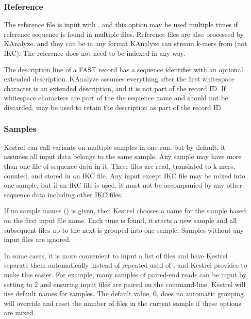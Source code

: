 \subsubsection{Reference}
\label{sec.process.input.seq}

The reference file is input with , and this option may be used multiple times if reference sequence is found in multiple files. Reference files are also processed by KAnalyze, and they can be in any format KAnalyze can stream k-mers from (not IKC). The reference does not need to be indexed in any way.

The description line of a FAST record has a sequence identifier with an optional extended description. KAnalyze assumes everything after the first whitespace character is an extended description, and it is not part of the record ID. If whitespace characters are part of the the sequence name and should not be discarded,  may be used to retain the description as part of the record ID.


\subsubsection{Samples}
\label{sec.process.input.samples}

Kestrel can call variants on multiple samples in one run, but by default, it assumes all input data belongs to the same sample. Any sample may have more than one file of sequence data in it. These files are read, translated to k-mers, counted, and stored in an IKC file. Any input except IKC file may be mixed into one sample, but if an IKC file is used, it must not be accompanied by any other sequence data including other IKC files.

If no sample names () is given, then Kestrel chooses a name for the sample based on the first input file name. Each time  is found, it starts a new sample and all subsequent files up to the next  is grouped into one sample. Samples without any input files are ignored.

In some cases, it is more convenient to input a list of files and have Kestrel separate them automatically instead of repeated used of , and Kestrel provides  to make this easier. For example, many samples of paired-end reads can be input by setting  to $2$ and ensuring input files are paired on the command-line. Kestrel will use default names for samples. The default value, $0$, does no automatic grouping.  will override  and reset the number of files in the current sample if these options are mixed.


